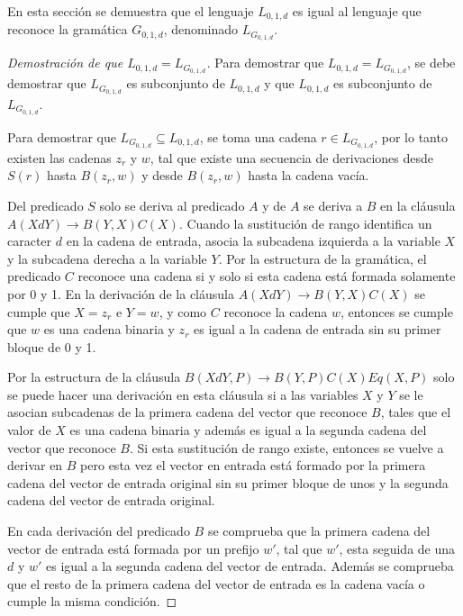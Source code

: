 En esta sección se demuestra que el lenguaje $L_{0,1,d}$ es igual al lenguaje que reconoce la gramática $G_{0,1,d}$,
denominado $L_{G_{0,1,d}}$.

\begin{proof}[Demostración de que $L_{0,1,d}=L_{G_{0,1,d}}$]
    
    Para demostrar que $L_{0,1,d}=L_{G_{0,1,d}}$, se debe demostrar que $L_{G_{0,1,d}}$ es subconjunto de $L_{0,1,d}$ y que
    $L_{0,1,d}$ es subconjunto de $L_{G_{0,1,d}}$. 
    
    Para demostrar que $L_{G_{0,1,d}}\subseteq L_{0,1,d}$, se toma una cadena $r\in L_{G_{0,1,d}}$, por lo tanto existen las cadenas $z_r$ y $w$, tal que existe una secuencia de derivaciones desde $S(r)$ hasta $B(z_r,w)$ y desde $B(z_r,w)$ hasta la cadena vacía.
    
    Del predicado $S$ solo se deriva al predicado $A$ y de $A$ se deriva a $B$ en la cláusula $A(XdY)\to B(Y,X)C(X)$.  Cuando la sustitución de rango identifica un caracter $d$ en la cadena de entrada, asocia la subcadena izquierda a la variable $X$ y la subcadena derecha a la variable $Y$. Por la estructura de la gramática, el predicado $C$ reconoce una cadena si y solo si esta cadena está formada solamente por 0 y 1. En la derivación de la cláusula $A(XdY)\to B(Y,X)C(X)$ se cumple que $X=z_r$ e $Y=w$, y como $C$ reconoce la cadena $w$, entonces se cumple que $w$ es una cadena binaria y $z_r$ es igual a la cadena de entrada sin su primer bloque de 0 y 1.
    
    Por la estructura de la cláusula $B(XdY,P)\to B(Y,P) C(X) Eq(X,P)$ solo se puede hacer una derivación en esta cláusula si a las variables $X$ y $Y$ se le asocian subcadenas de la primera cadena del vector que reconoce $B$, tales que el valor de $X$ es una cadena binaria y además es igual a la segunda cadena del vector que reconoce $B$. Si esta sustitución de rango existe, entonces se vuelve a derivar en $B$ pero esta vez el vector en entrada está formado por la primera cadena del vector de entrada original sin su primer bloque de unos y la segunda cadena del vector de entrada original.
    
    En cada derivación del predicado $B$ se comprueba que la primera cadena del vector de entrada está formada por un prefijo $w'$, tal que $w'$, esta seguida de una $d$ y $w'$ es igual a la segunda cadena del vector de entrada. Además se comprueba que el resto de la primera cadena del vector de entrada es la cadena vacía o cumple la misma condición.
    

\end{proof}
